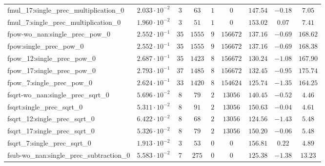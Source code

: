 \begin{tabular}{|l|c|c|c|c|c|c|c|c|}
fmul\_17:single\_prec\_multiplication\_0       & $ 2.033 \cdot 10^{-2} $ & $ 3      $ & $ 63     $ & $ 1   $ & $ 0      $ & $ 147.54      $ & $ -0.18   $ & $ 7.05    $ \\
fmul\_7:single\_prec\_multiplication\_0        & $ 1.960 \cdot 10^{-2} $ & $ 3      $ & $ 51     $ & $ 1   $ & $ 0      $ & $ 153.02      $ & $ 0.07    $ & $ 7.41    $ \\
fpow-wo\_nan:single\_prec\_pow\_0              & $ 2.552 \cdot 10^{-1} $ & $ 35     $ & $ 1555   $ & $ 9   $ & $ 156672 $ & $ 137.16      $ & $ -0.69   $ & $ 168.62  $ \\
fpow:single\_prec\_pow\_0                      & $ 2.552 \cdot 10^{-1} $ & $ 35     $ & $ 1555   $ & $ 9   $ & $ 156672 $ & $ 137.16      $ & $ -0.69   $ & $ 168.38  $ \\
fpow\_12:single\_prec\_pow\_0                  & $ 2.687 \cdot 10^{-1} $ & $ 35     $ & $ 1423   $ & $ 8   $ & $ 156672 $ & $ 130.24      $ & $ -1.08   $ & $ 167.90  $ \\
fpow\_17:single\_prec\_pow\_0                  & $ 2.793 \cdot 10^{-1} $ & $ 37     $ & $ 1485   $ & $ 8   $ & $ 156672 $ & $ 132.45      $ & $ -0.95   $ & $ 175.74  $ \\
fpow\_7:single\_prec\_pow\_0                   & $ 2.624 \cdot 10^{-1} $ & $ 33     $ & $ 1420   $ & $ 8   $ & $ 154624 $ & $ 125.74      $ & $ -1.35   $ & $ 164.25  $ \\
fsqrt-wo\_nan:single\_prec\_sqrt\_0            & $ 5.696 \cdot 10^{-2} $ & $ 8      $ & $ 79     $ & $ 2   $ & $ 13056  $ & $ 140.45      $ & $ -0.52   $ & $ 4.46    $ \\
fsqrt:single\_prec\_sqrt\_0                    & $ 5.311 \cdot 10^{-2} $ & $ 8      $ & $ 91     $ & $ 2   $ & $ 13056  $ & $ 150.63      $ & $ -0.04   $ & $ 4.61    $ \\
fsqrt\_12:single\_prec\_sqrt\_0                & $ 6.422 \cdot 10^{-2} $ & $ 8      $ & $ 68     $ & $ 2   $ & $ 13056  $ & $ 124.56      $ & $ -1.43   $ & $ 5.48    $ \\
fsqrt\_17:single\_prec\_sqrt\_0                & $ 5.326 \cdot 10^{-2} $ & $ 8      $ & $ 79     $ & $ 2   $ & $ 13056  $ & $ 150.20      $ & $ -0.06   $ & $ 5.48    $ \\
fsqrt\_7:single\_prec\_sqrt\_0                 & $ 1.913 \cdot 10^{-2} $ & $ 3      $ & $ 53     $ & $ 0   $ & $ 0      $ & $ 156.81      $ & $ 0.22    $ & $ 4.89    $ \\
fsub-wo\_nan:single\_prec\_subtraction\_0      & $ 5.583 \cdot 10^{-2} $ & $ 7      $ & $ 275    $ & $ 0   $ & $ 0      $ & $ 125.38      $ & $ -1.38   $ & $ 13.23   $ \\

\end{tabular}
